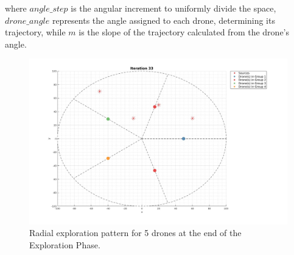 where $angle\_step$ is the angular increment to uniformly divide the space, $drone\_angle$ represents the angle assigned to each drone, determining its trajectory, 
while $m$ is the slope of the trajectory calculated from the drone's angle. 

\begin{figure}
    \centering
    \includegraphics[width=\textwidth]{images/exploration_pattern.jpg} 
    \caption{Radial exploration pattern for 5 drones at the end of the Exploration Phase.}
    \label{fig:exploration_pattern}
\end{figure}

